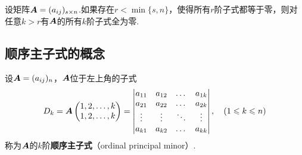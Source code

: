 \begin{property}
设矩阵\(\boldsymbol{A} = (a_{ij})_{s \times n}\).如果存在\(r < \min\{s,n\}\)，使得所有\(r\)阶子式都等于零，则对任意\(k > r\)有\(\boldsymbol{A}\)的所有\(k\)阶子式全为零.
\end{property}

\subsection{顺序主子式的概念}
\begin{definition}
设\(\boldsymbol{A}=(a_{ij})_n\)，\(\boldsymbol{A}\)位于左上角的子式\[
D_k = \boldsymbol{A}\begin{pmatrix}
1,2,\dotsc,k \\
1,2,\dotsc,k
\end{pmatrix} = \begin{vmatrix}
a_{11} & a_{12} & \dots & a_{1k} \\
a_{21} & a_{22} & \dots & a_{2k} \\
\vdots & \vdots & \ddots & \vdots \\
a_{k1} & a_{k2} & \dots & a_{kk}
\end{vmatrix},
\quad(1 \leqslant k \leqslant n)
\]称为\(\boldsymbol{A}\)的\(k\)阶\textbf{顺序主子式}（ordinal principal minor）.
\end{definition}

